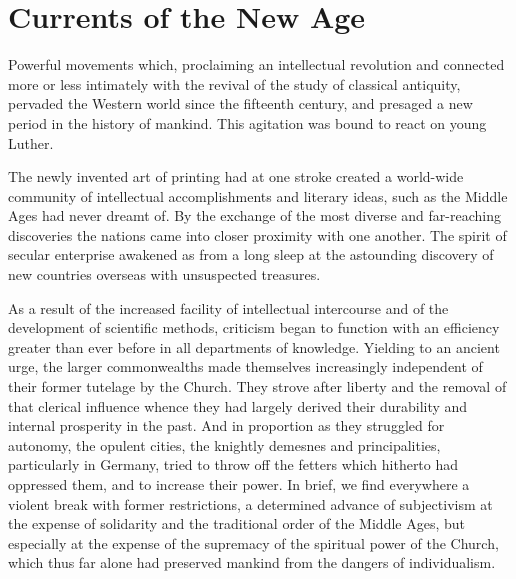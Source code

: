 \section{Currents of the New Age}

Powerful movements which, proclaiming an intellectual revolution and
connected more or less intimately with the revival of the
study of classical antiquity, pervaded the Western world since the
fifteenth century, and presaged a new period in the history of mankind.
This agitation was bound to react on young Luther.

The newly invented art of printing had at one stroke created a
world-wide community of intellectual accomplishments and literary
ideas, such as the Middle Ages had never dreamt of. By the exchange
of the most diverse and far-reaching discoveries the nations came
into closer proximity with one another. The spirit of secular enterprise
awakened as from a long sleep at the astounding discovery of
new countries overseas with unsuspected treasures.

As a result of the increased facility of intellectual intercourse
and of the development of scientific methods, criticism began to
function with an efficiency greater than ever before in all departments
of knowledge. Yielding to an ancient urge, the larger commonwealths
made themselves increasingly independent of their
former tutelage by the Church. They strove after liberty and the
removal of that clerical influence whence they had largely derived
their durability and internal prosperity in the past. And in proportion
as they struggled for autonomy, the opulent cities, the knightly
demesnes and principalities, particularly in Germany, tried to throw
off the fetters which hitherto had oppressed them, and to increase
their power. In brief, we find everywhere a violent break with former
restrictions, a determined advance of subjectivism at the expense of
solidarity and the traditional order of the Middle Ages, but especially
at the expense of the supremacy of the spiritual power of the Church,
which thus far alone had preserved mankind from the dangers of
individualism.

